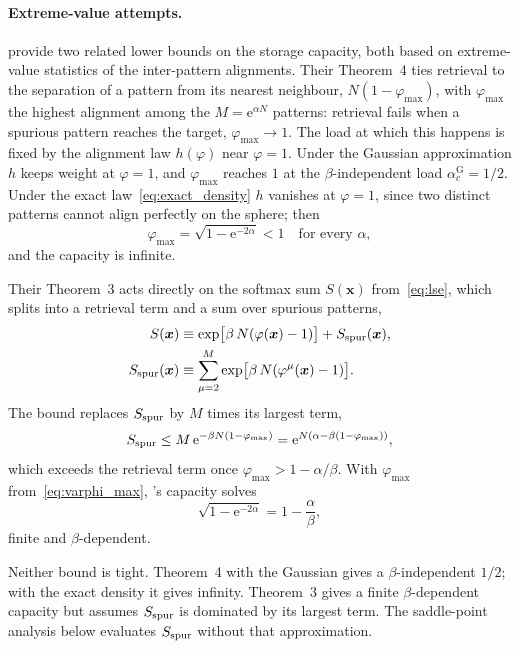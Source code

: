 \documentclass[letterpaper]{article} %
\newcommand{\bx}{\bm{x}}
\newcommand{\e}{{\mathrm{e}}}
\newcommand{\Bnet}{\beta}
\newcommand{\acGauss}{\alpha_c^{\mathrm{G}}}
\begin{document}
\paragraph{Extreme-value attempts.}
\citet{ramsauer2021hopfield} provide two related lower bounds on the storage
capacity, both based on extreme-value statistics of the inter-pattern alignments.
Their Theorem~4 ties retrieval to the separation of a pattern from its nearest
neighbour, $N(1-\varphi_{\max})$, with $\varphi_{\max}$ the highest alignment among
the $M = \e^{\alpha N}$ patterns: retrieval fails when a spurious pattern reaches
the target, $\varphi_{\max} \to 1$. The load at which this happens is fixed by the
alignment law $h(\varphi)$ near $\varphi = 1$. Under the Gaussian approximation
$h$ keeps weight at $\varphi = 1$, and $\varphi_{\max}$ reaches $1$ at the
$\Bnet$-independent load $\acGauss = 1/2$. Under the exact
law~\eqref{eq:exact_density} $h$ vanishes at $\varphi = 1$, since two distinct
patterns cannot align perfectly on the sphere; then
\begin{equation}
    \varphi_{\max} = \sqrt{1 - \e^{-2\alpha}} < 1 \quad \text{for every $\alpha$},
    \label{eq:varphi_max}
\end{equation}
and the capacity is infinite.

Their Theorem~3 acts directly on the softmax sum $S(\bx)$ from~\eqref{eq:lse},
which splits into a retrieval term and a sum over spurious patterns,
\begin{align}
S(\bx) &\equiv \exp\!\big[\Bnet\,N (\varphi(\bx) - 1)\big] + S_{\rm spur}(\bx),
\label{eq:softmax_sum}\\
S_{\rm spur}(\bx) &\equiv \sum_{\mu=2}^{M} \exp\!\big[\Bnet\,N (\varphi^\mu(\bx) - 1)\big].
\label{eq:spur_sum}
\end{align}
The bound replaces $S_{\rm spur}$ by $M$ times its largest term,
\begin{equation}
S_{\rm spur} \le M\,\e^{-\Bnet N(1-\varphi_{\max})} = \e^{N(\alpha - \Bnet(1-\varphi_{\max}))},
\label{eq:ramsauer_bound}
\end{equation}
which exceeds the retrieval term once $\varphi_{\max} > 1 - \alpha/\Bnet$. With
$\varphi_{\max}$ from~\eqref{eq:varphi_max}, \citeauthor{ramsauer2021hopfield}'s
capacity solves
\begin{equation}
\sqrt{1 - \e^{-2\alpha}} = 1 - \frac{\alpha}{\Bnet},
\label{eq:ramsauer_capacity}
\end{equation}
finite and $\Bnet$-dependent.

Neither bound is tight. Theorem~4 with the Gaussian gives a $\Bnet$-independent
$1/2$; with the exact density it gives infinity. Theorem~3 gives a finite
$\Bnet$-dependent capacity but assumes $S_{\rm spur}$ is dominated by its largest
term. The saddle-point analysis below evaluates $S_{\rm spur}$ without that
approximation.
\end{document}
